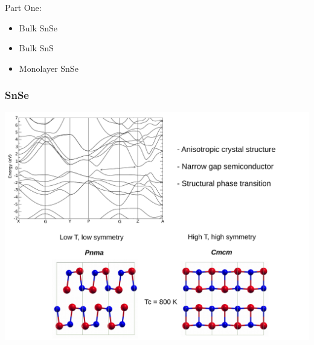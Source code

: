 \documentclass{beamer}
\begin{document}

\begin{frame}

Part One:
\begin{itemize}
\item Bulk SnSe
\item Bulk SnS
\item Monolayer SnSe
\end{itemize}

\end{frame}


\begin{frame}

\frametitle{SnSe}
\begin{center}
  \includegraphics[width=0.85\linewidth]{Pictures/SnSe/figure1.pdf}
\end{center}

\end{frame}

\end{document}
